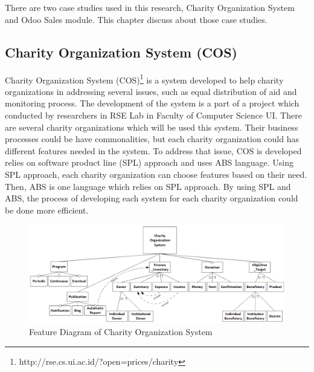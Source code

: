 \chapter{\babEmpat}\label{casestudy}
There are two case studies used in this research, Charity Organization System and Odoo Sales module. This chapter discuss about those case studies.

\section{Charity Organization System (COS)}
Charity Organization System (COS)\footnote{http://rse.cs.ui.ac.id/?open=prices/charity} is a system developed to help charity organizations in addressing several issues, such as equal distribution of aid and monitoring process. The development of the system is a part of a project which conducted by researchers in RSE Lab in Faculty of Computer Science UI. There are several charity organizations which will be used this system. Their business processes could be have commonalities, but each charity organization could has different features needed in the system. To address that issue, COS is developed relies on software product line (SPL) approach and uses ABS language. Using SPL approach, each charity organization can choose features based on their need. Then, ABS is one language which relies on SPL approach. By using SPL and ABS, the process of developing each system for each charity organization could be done more efficient.

\begin{figure}
	\centering
	\includegraphics[width=1\textwidth]
	{pics/COSFD.png}
	\caption{Feature Diagram of Charity Organization System}
	\label{fig:COSFD}
\end{figure}

